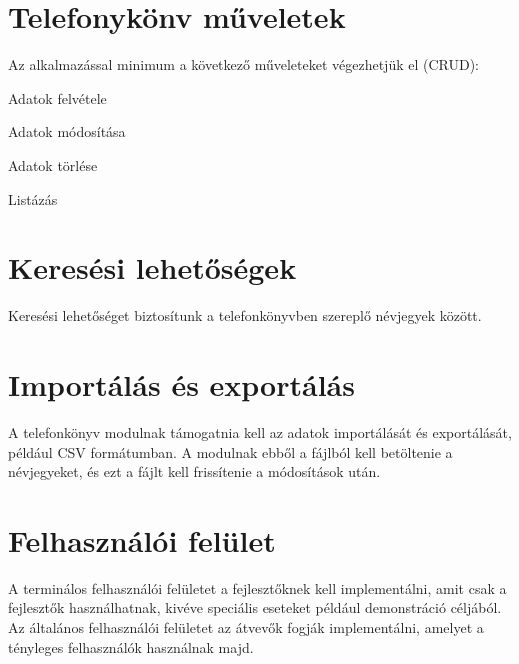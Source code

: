 \documentclass[11pt, letterpaper, openany, oneside]{book}
\begin{document}
\section{Telefonykönv műveletek}
Az alkalmazással minimum a következő műveleteket végezhetjük el (CRUD):

\vspace{5px}
\begin{compactitem}
    \item Adatok felvétele
    \item Adatok módosítása
    \item Adatok törlése
    \item Listázás
\end{compactitem}

\section{Keresési lehetőségek}
Keresési lehetőséget biztosítunk a telefonkönyvben szereplő névjegyek között.

\newpage

\section{Importálás és exportálás}
A telefonkönyv modulnak támogatnia kell az adatok importálását és exportálását, például CSV formátumban. A modulnak ebből a fájlból kell betöltenie a névjegyeket, és ezt a fájlt kell frissítenie a módosítások után.

\section{Felhasználói felület}
A terminálos felhasználói felületet a fejlesztőknek kell implementálni, amit csak a fejlesztők használhatnak, kivéve speciális eseteket például demonstráció céljából. Az általános felhasználói felületet az átvevők fogják implementálni, amelyet a tényleges felhasználók használnak majd.
\end{document}
